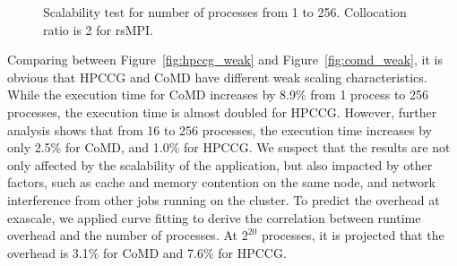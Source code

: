 \begin{figure}[!t]
	\begin{center}
	\end{center}
	\vskip -0.2in
	\caption{Scalability test for number of processes from 1 to 256. Collocation ratio is 2 for rsMPI.}
	\label{fig:scalability}
    \vspace{-0.2in}
\end{figure}

Comparing between Figure~\ref{fig:hpccg_weak} and Figure~\ref{fig:comd_weak}, it is obvious that HPCCG and CoMD have different weak scaling characteristics. While the execution time for CoMD increases by 8.9\% from 1 process to 256 processes, the execution time is almost doubled for HPCCG. However, further analysis shows that from 16 to 256 processes, the execution time increases by only 2.5\% for CoMD, and 1.0\% for HPCCG. We suspect that the results are not only affected by the scalability of the application, but also impacted by other factors, such as cache and memory contention on the same node, and network interference from other jobs running on the cluster. %
To predict the overhead at exascale, we applied curve fitting to derive the correlation between runtime overhead and the number of processes. At $2^{20}$ processes, it is projected that the overhead is 3.1\% for CoMD and 7.6\% for HPCCG. 

